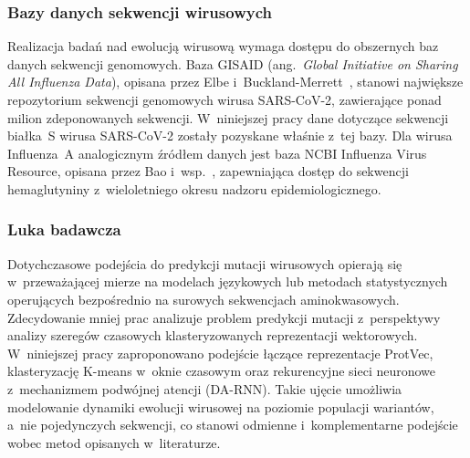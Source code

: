 \subsubsection{Bazy danych sekwencji wirusowych}

Realizacja badań nad ewolucją wirusową wymaga dostępu do obszernych baz danych sekwencji genomowych. Baza GISAID (ang.~\textit{Global Initiative on Sharing All Influenza Data}), opisana przez Elbe i~Buckland-Merrett~\cite{elbe2017gisaid}, stanowi największe repozytorium sekwencji genomowych wirusa SARS-CoV-2, zawierające ponad milion zdeponowanych sekwencji. W~niniejszej pracy dane dotyczące sekwencji białka~S wirusa SARS-CoV-2 zostały pozyskane właśnie z~tej bazy. Dla wirusa Influenza~A analogicznym źródłem danych jest baza NCBI Influenza Virus Resource, opisana przez Bao i~wsp.~\cite{bao2008ncbi}, zapewniająca dostęp do sekwencji hemaglutyniny z~wieloletniego okresu nadzoru epidemiologicznego.

\subsubsection{Luka badawcza}

Dotychczasowe podejścia do predykcji mutacji wirusowych opierają się w~przeważającej mierze na modelach językowych lub metodach statystycznych operujących bezpośrednio na surowych sekwencjach aminokwasowych. Zdecydowanie mniej prac analizuje problem predykcji mutacji z~perspektywy analizy szeregów czasowych klasteryzowanych reprezentacji wektorowych. W~niniejszej pracy zaproponowano podejście łączące reprezentacje ProtVec, klasteryzację K-means w~oknie czasowym oraz rekurencyjne sieci neuronowe z~mechanizmem podwójnej atencji (DA-RNN). Takie ujęcie umożliwia modelowanie dynamiki ewolucji wirusowej na poziomie populacji wariantów, a~nie pojedynczych sekwencji, co stanowi odmienne i~komplementarne podejście wobec metod opisanych w~literaturze.
